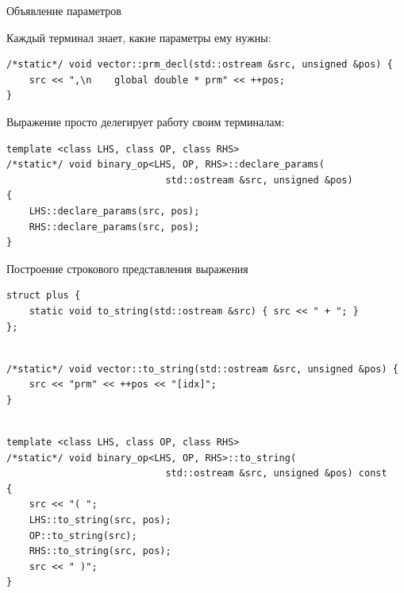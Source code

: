 \documentclass[@BEAMER_OPTIONS@]{beamer}
\begin{document}
\note{ }

\begin{frame}[fragile]{Объявление параметров}
    \begin{exampleblock}{Каждый терминал знает, какие параметры ему нужны:}
        \begin{lstlisting}
/*static*/ void vector::prm_decl(std::ostream &src, unsigned &pos) {
    src << ",\n    global double * prm" << ++pos;
}
        \end{lstlisting}
    \end{exampleblock}
    \begin{exampleblock}{Выражение просто делегирует работу своим терминалам:}
        \begin{lstlisting}[firstnumber=last]
template <class LHS, class OP, class RHS>
/*static*/ void binary_op<LHS, OP, RHS>::declare_params(
                            std::ostream &src, unsigned &pos)
{
    LHS::declare_params(src, pos);
    RHS::declare_params(src, pos);
}
        \end{lstlisting}
    \end{exampleblock}
\end{frame}

\note{ }

\begin{frame}[fragile]{Построение строкового представления выражения}
    \begin{exampleblock}{}
        \begin{lstlisting}
struct plus {
    static void to_string(std::ostream &src) { src << " + "; }
};
        \end{lstlisting}
        \pause
        \begin{lstlisting}[firstnumber=last]

/*static*/ void vector::to_string(std::ostream &src, unsigned &pos) {
    src << "prm" << ++pos << "[idx]";
}
        \end{lstlisting}
        \pause
        \begin{lstlisting}[firstnumber=last]

template <class LHS, class OP, class RHS>
/*static*/ void binary_op<LHS, OP, RHS>::to_string(
                            std::ostream &src, unsigned &pos) const
{
    src << "( ";
    LHS::to_string(src, pos);
    OP::to_string(src);
    RHS::to_string(src, pos);
    src << " )";
}
        \end{lstlisting}
    \end{exampleblock}
\end{frame}
\end{document}
